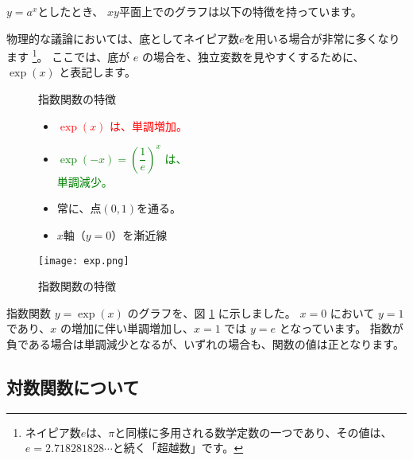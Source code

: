 \documentclass[uplatex,dvipdfmx,a4paper,11pt]{jsarticle}
\begin{document}
$y=a^x$としたとき、 $xy$平面上でのグラフは以下の特徴を持っています。

物理的な議論においては、底としてネイピア数$e$を用いる場合が非常に多くなります
\footnote{ネイピア数$e$は、$\pi$と同様に多用される数学定数の一つであり、その値は、$e=2.718281828 \cdots $と続く「超越数」です。}。
ここでは、底が $e$ の場合を、独立変数を見やすくするために、$\exp (x)$ と表記します。
\begin{figure}[htb]
	\begin{center}
		\begin{minipage}{0.45\textwidth}
			\large
			\begin{itembox}[l]{指数関数の特徴}
				\begin{itemize}
					\item \textcolor{red}{$\exp (x)$ は、単調増加。}
					\item \textcolor{green}{$\exp (-x) = \left(\dfrac{1}{e} \right)^x$ は、\\単調減少。}
					\item 常に、点$(0,1)$を通る。
					\item $x$軸（$y=0$）を漸近線
				\end{itemize}
			\end{itembox}
		\end{minipage}
		\begin{minipage}{0.45\textwidth}
			\begin{center}
			\texttt{[image: exp.png]}
			\end{center}
		\end{minipage}
		\caption{指数関数の特徴}
		\label{fig: exp(x)}
	\end{center}
\end{figure}

指数関数 $y = \exp (x)$ のグラフを、図 \ref{fig: exp(x)} に示しました。
$x=0$ において $y=1$ であり、$x$ の増加に伴い単調増加し、$x=1$ では $y=e$ となっています。
指数が負である場合は単調減少となるが、いずれの場合も、関数の値は正となります。

\subsection{対数関数について}
\end{document}
